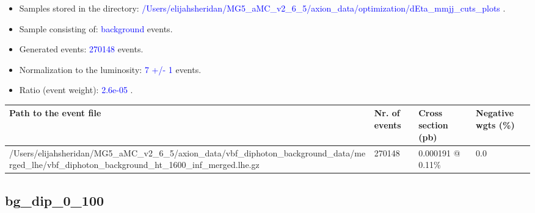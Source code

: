 \documentclass[a4paper, 10pt]{article}
\begin{document}
\begin{itemize}
  \item Samples stored in the directory: \textcolor{blue}{/\-Users/\-elijahsheridan/\-MG5\_aMC\_v2\_6\_5/\-axion\_data/\-optimization/\-dEta\_mmjj\_cuts\_plots} .
   \item Sample consisting of: \textcolor{blue}{background}  events.
   \item Generated events: \textcolor{blue}{270148 }  events.
   \item Normalization to the luminosity: \textcolor{blue}{7}\textcolor{blue}{ +/\-- }\textcolor{blue}{1 }  events.
   \item Ratio (event weight): \textcolor{blue}{2.6e-05 } .  
 
\end{itemize}
\begin{table}[H]
  \begin{center}
    \begin{tabular}{|m{55.0mm}|m{25.0mm}|m{30.0mm}|m{30.0mm}|}
      \hline
      {\cellcolor{yellow}         Path to the event file}& {\cellcolor{yellow}         Nr. of events}& {\cellcolor{yellow}         Cross section (pb)}& {\cellcolor{yellow}         Negative wgts (\%)}\\
      \hline
      {\cellcolor{white}          /\-Users/\-elijahsheridan/\-MG5\_aMC\_v2\_6\_5/\-axion\_data/\-vbf\_diphoton\_background\_data/\-merged\_lhe/\-vbf\_diphoton\_background\_ht\_1600\_inf\_merged.lhe.gz}& {\cellcolor{white}          270148}& {\cellcolor{white}          0.000191 @ 0.11\%}& {\cellcolor{white}          0.0}\\
\hline
    \end{tabular}
  \end{center}
\end{table}

\subsection{ bg\_dip\_0\_100}
\end{document}
